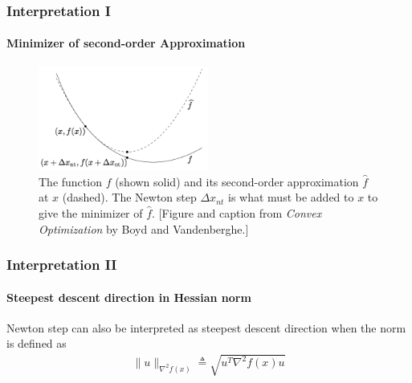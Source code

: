 \documentclass{beamer}
\begin{document}
\begin{frame}
\frametitle{Interpretation I}
\framesubtitle{Minimizer of second-order Approximation}
\begin{figure}
\includegraphics[width=2.2in]{minimizer.png}
\caption{
The function $f$ (shown solid) and its second-order approximation
$\hat{f}$ at $x$ (dashed). The Newton step $\Delta x_{nt}$ is what must be added to $x$ to give the minimizer of $\hat{f}$. [Figure and caption from  \textit{Convex Optimization} by Boyd and Vandenberghe.]
}
\label{fig:1}
\end{figure}
\end{frame}
\begin{frame}
\frametitle{Interpretation II}
\framesubtitle{Steepest descent direction in Hessian norm}
    Newton step can also be interpreted as 
    steepest descent direction when the norm is defined as
    \begin{align}
        \| u \|_{\nabla^2 f(x)} \triangleq \sqrt{u^T \nabla^2 f(x) u}
    \end{align}
\end{frame}
\end{document}
